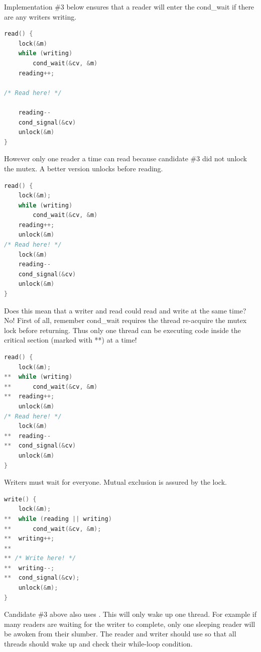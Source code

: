 Implementation \#3 below ensures that a reader will enter the cond\_wait if there are any writers writing.

\begin{lstlisting}[language=C]
read() {
    lock(&m)
    while (writing)
        cond_wait(&cv, &m)
    reading++;

/* Read here! */

    reading--
    cond_signal(&cv)
    unlock(&m)
}
\end{lstlisting}

However only one reader a time can read because candidate \#3 did not unlock the mutex.
A better version unlocks before reading.

\begin{lstlisting}[language=C]
read() {
    lock(&m);
    while (writing)
        cond_wait(&cv, &m)
    reading++;
    unlock(&m)
/* Read here! */
    lock(&m)
    reading--
    cond_signal(&cv)
    unlock(&m)
}
\end{lstlisting}

Does this mean that a writer and read could read and write at the same time?
No! First of all, remember cond\_wait requires the thread re-acquire the mutex lock before returning.
Thus only one thread can be executing code inside the critical section (marked with **) at a time!

\begin{lstlisting}[language=C]
read() {
    lock(&m);
**  while (writing)
**      cond_wait(&cv, &m)
**  reading++;
    unlock(&m)
/* Read here! */
    lock(&m)
**  reading--
**  cond_signal(&cv)
    unlock(&m)
}
\end{lstlisting}

Writers must wait for everyone.
Mutual exclusion is assured by the lock.

\begin{lstlisting}[language=C]
write() {
    lock(&m);
**  while (reading || writing)
**      cond_wait(&cv, &m);
**  writing++;
**
** /* Write here! */
**  writing--;
**  cond_signal(&cv);
    unlock(&m);
}
\end{lstlisting}

Candidate \#3 above also uses .
This will only wake up one thread.
For example if many readers are waiting for the writer to complete, only one sleeping reader will be awoken from their slumber.
The reader and writer should use  so that all threads should wake up and check their while-loop condition.

